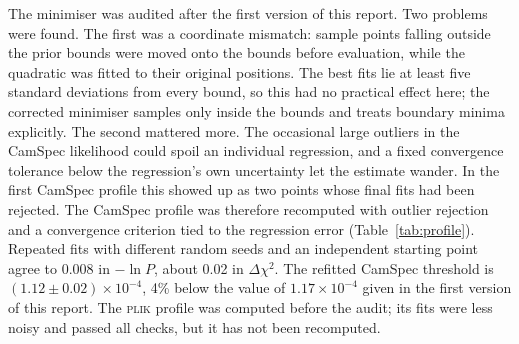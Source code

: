 \documentclass[11pt,a4paper]{article}
\newcommand{\dchi}{\Delta\chi^2}
\begin{document}
The minimiser was audited after the first version of this report. Two problems were found. The first was a coordinate mismatch: sample points falling outside the prior bounds were moved onto the bounds before evaluation, while the quadratic was fitted to their original positions. The best fits lie at least five standard deviations from every bound, so this had no practical effect here; the corrected minimiser samples only inside the bounds and treats boundary minima explicitly. The second mattered more. The occasional large outliers in the CamSpec likelihood could spoil an individual regression, and a fixed convergence tolerance below the regression's own uncertainty let the estimate wander. In the first CamSpec profile this showed up as two points whose final fits had been rejected. The CamSpec profile was therefore recomputed with outlier rejection and a convergence criterion tied to the regression error (Table~\ref{tab:profile}). Repeated fits with different random seeds and an independent starting point agree to 0.008 in $-\ln P$, about 0.02 in $\dchi$. The refitted CamSpec threshold is $(1.12 \pm 0.02)\times10^{-4}$, 4\% below the value of $1.17\times10^{-4}$ given in the first version of this report. The \textsc{plik} profile was computed before the audit; its fits were less noisy and passed all checks, but it has not been recomputed.
\end{document}
